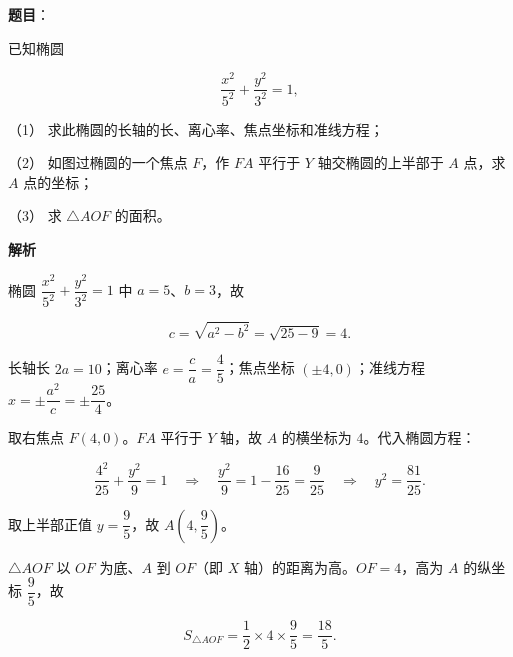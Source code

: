 \begin{answer}

\textbf{题目}：

已知椭圆

\nopagebreak[4]
\[
\frac{x^2}{5^2}+\frac{y^2}{3^2}=1,
\]

（1） 求此椭圆的长轴的长、离心率、焦点坐标和准线方程；

（2） 如图过椭圆的一个焦点 $F$，作 $FA$ 平行于 $Y$ 轴交椭圆的上半部于 $A$ 点，求 $A$ 点的坐标；
\nopagebreak[4]
\begin{center}\end{center}
\nopagebreak[4]
（3） 求 $\triangle AOF$ 的面积。

\textbf{解析}


椭圆 $\dfrac{x^2}{5^2}+\dfrac{y^2}{3^2}=1$ 中 $a=5$、$b=3$，故

\nopagebreak[4]
\[
c=\sqrt{a^2-b^2}=\sqrt{25-9}=4.
\]

长轴长 $2a=10$；离心率 $e=\dfrac ca=\dfrac45$；焦点坐标 $(\pm4,0)$；准线方程 $x=\pm\dfrac{a^2}c=\pm\dfrac{25}4$。


取右焦点 $F(4,0)$。$FA$ 平行于 $Y$ 轴，故 $A$ 的横坐标为 $4$。代入椭圆方程：

\nopagebreak[4]
\[
\frac{4^2}{25}+\frac{y^2}9=1
\quad\Longrightarrow\quad
\frac{y^2}9=1-\frac{16}{25}=\frac9{25}
\quad\Longrightarrow\quad
y^2=\frac{81}{25}.
\]

取上半部正值 $y=\dfrac95$，故 $A\left(4,\dfrac95\right)$。


$\triangle AOF$ 以 $OF$ 为底、$A$ 到 $OF$（即 $X$ 轴）的距离为高。$OF=4$，高为 $A$ 的纵坐标 $\dfrac95$，故

\nopagebreak[4]
\[
S_{\triangle AOF}=\frac12\times4\times\frac95=\frac{18}5.
\]




\end{answer}
